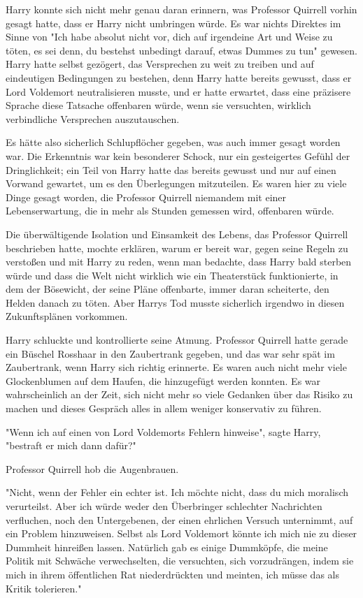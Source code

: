 {Harry konnte sich nicht mehr genau daran erinnern, was Professor Quirrell vorhin gesagt hatte, dass er Harry nicht umbringen würde. Es war nichts Direktes im Sinne von "Ich habe absolut nicht vor, dich auf irgendeine Art und Weise zu töten, es sei denn, du bestehst unbedingt darauf, etwas Dummes zu tun" gewesen. Harry hatte selbst gezögert, das Versprechen zu weit zu treiben und auf eindeutigen Bedingungen zu bestehen, denn Harry hatte bereits gewusst, dass er Lord Voldemort neutralisieren musste, und er hatte erwartet, dass eine präzisere Sprache diese Tatsache offenbaren würde, wenn sie versuchten, wirklich verbindliche Versprechen auszutauschen.

Es hätte also sicherlich Schlupflöcher gegeben, was auch immer gesagt worden war. Die Erkenntnis war kein besonderer Schock, nur ein gesteigertes Gefühl der Dringlichkeit; ein Teil von Harry hatte das bereits gewusst und nur auf einen Vorwand gewartet, um es den Überlegungen mitzuteilen. Es waren hier zu viele Dinge gesagt worden, die Professor Quirrell niemandem mit einer Lebenserwartung, die in mehr als Stunden gemessen wird, offenbaren würde.

Die überwältigende Isolation und Einsamkeit des Lebens, das Professor Quirrell beschrieben hatte, mochte erklären, warum er bereit war, gegen seine Regeln zu verstoßen und mit Harry zu reden, wenn man bedachte, dass Harry bald sterben würde und dass die Welt nicht wirklich wie ein Theaterstück funktionierte, in dem der Bösewicht, der seine Pläne offenbarte, immer daran scheiterte, den Helden danach zu töten. Aber Harrys Tod musste sicherlich irgendwo in diesen Zukunftsplänen vorkommen.

Harry schluckte und kontrollierte seine Atmung. Professor Quirrell hatte gerade ein Büschel Rosshaar in den Zaubertrank gegeben, und das war sehr spät im Zaubertrank, wenn Harry sich richtig erinnerte. Es waren auch nicht mehr viele Glockenblumen auf dem Haufen, die hinzugefügt werden konnten. Es war wahrscheinlich an der Zeit, sich nicht mehr so viele Gedanken über das Risiko zu machen und dieses Gespräch alles in allem weniger konservativ zu führen.

"Wenn ich auf einen von Lord Voldemorts Fehlern hinweise", sagte Harry, "bestraft er mich dann dafür?"

Professor Quirrell hob die Augenbrauen.

"Nicht, wenn der Fehler ein echter ist. Ich möchte nicht, dass du mich moralisch verurteilst. Aber ich würde weder den Überbringer schlechter Nachrichten verfluchen, noch den Untergebenen, der einen ehrlichen Versuch unternimmt, auf ein Problem hinzuweisen. Selbst als Lord Voldemort könnte ich mich nie zu dieser Dummheit hinreißen lassen. Natürlich gab es einige Dummköpfe, die meine Politik mit Schwäche verwechselten, die versuchten, sich vorzudrängen, indem sie mich in ihrem öffentlichen Rat niederdrückten und meinten, ich müsse das als Kritik tolerieren."

}
